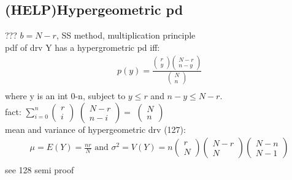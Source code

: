 \documentclass[12pt]{article}
\begin{document}
	\subsection{(HELP)Hypergeometric pd}
		??? $ b = N - r $, SS method, multiplication principle \\
		pdf of drv Y has a hypergrometric pd iff:
		\begin{align*}
			p(y) = 
			\frac{\begin{pmatrix} r \\ y \end{pmatrix}
			\begin{pmatrix} N - r \\ n - y \end{pmatrix}}
			{\begin{pmatrix} N \\ n \end{pmatrix}} \\
		\end{align*}
		where y is an int 0-n, subject to $ y \le r $ and 
		$ n - y  \le N - r $. \\
		fact: $ \sum_{i=0}^n \begin{pmatrix} r \\ i\end{pmatrix} $
		$ \begin{pmatrix} N - r \\ n-i \end{pmatrix} = $
		$ \begin{pmatrix} N \\ n \end{pmatrix} $ \\
		mean and variance of hypergeometric drv (127):
		\begin{align*}
			\mu = E(Y) = \frac{nr}{N} \text{ and } 
			\sigma^2 = V(Y) = n
			\begin{pmatrix} r \\ N \end{pmatrix}
			\begin{pmatrix} N-r \\ N \end{pmatrix}
			\begin{pmatrix} N-n \\ N-1 \end{pmatrix} \\
		\end{align*}
		see 128 semi proof
\end{document}
